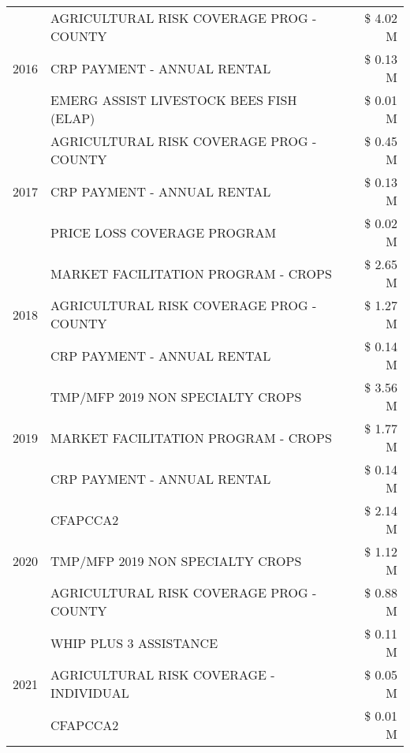 \begin{tabular}{llr}
\cline{1-3}
\multirow[t]{3}{*}{2016} & AGRICULTURAL RISK COVERAGE PROG - COUNTY      & \$ 4.02 M \\
 & CRP PAYMENT - ANNUAL RENTAL                   & \$ 0.13 M \\
 & EMERG ASSIST LIVESTOCK BEES FISH (ELAP)       & \$ 0.01 M \\
\cline{1-3}
\multirow[t]{3}{*}{2017} & AGRICULTURAL RISK COVERAGE PROG - COUNTY & \$ 0.45 M \\
 & CRP PAYMENT - ANNUAL RENTAL & \$ 0.13 M \\
 & PRICE LOSS COVERAGE PROGRAM & \$ 0.02 M \\
\cline{1-3}
\multirow[t]{3}{*}{2018} & MARKET FACILITATION PROGRAM - CROPS & \$ 2.65 M \\
 & AGRICULTURAL RISK COVERAGE PROG - COUNTY & \$ 1.27 M \\
 & CRP PAYMENT - ANNUAL RENTAL & \$ 0.14 M \\
\cline{1-3}
\multirow[t]{3}{*}{2019} & TMP/MFP 2019 NON SPECIALTY CROPS & \$ 3.56 M \\
 & MARKET FACILITATION PROGRAM - CROPS & \$ 1.77 M \\
 & CRP PAYMENT - ANNUAL RENTAL & \$ 0.14 M \\
\cline{1-3}
\multirow[t]{3}{*}{2020} & CFAPCCA2 & \$ 2.14 M \\
 & TMP/MFP 2019 NON SPECIALTY CROPS & \$ 1.12 M \\
 & AGRICULTURAL RISK COVERAGE PROG - COUNTY & \$ 0.88 M \\
\cline{1-3}
\multirow[t]{3}{*}{2021} & WHIP PLUS 3 ASSISTANCE & \$ 0.11 M \\
 & AGRICULTURAL RISK COVERAGE - INDIVIDUAL & \$ 0.05 M \\
 & CFAPCCA2 & \$ 0.01 M \\
\cline{1-3}
\bottomrule
\end{tabular}
